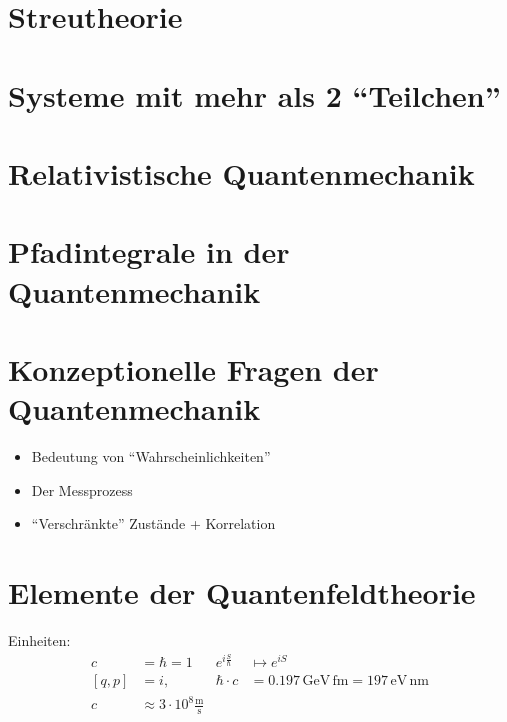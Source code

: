 \documentclass[ngerman, paper=a4, 12pt]{scrartcl}
\begin{document}
	\section{Streutheorie}
	 
	
	
	\section{Systeme mit mehr als 2 ``Teilchen''}
	
	
	 
	
	
	\section{Relativistische Quantenmechanik}
	
	
	
	\section{Pfadintegrale in der Quantenmechanik}
	
	
	
	
	
	
	
	
	
	
	\section{Konzeptionelle Fragen der Quantenmechanik} 
	\begin{itemize}
		\item Bedeutung von ``Wahrscheinlichkeiten''
		\item Der Messprozess
		\item ``Verschränkte'' Zustände + Korrelation
	\end{itemize}
	
	
	
	
	
	\section{Elemente der Quantenfeldtheorie} 
	Einheiten:
		\begin{align*}
			 c &= \hbar = 1 & e^{i \frac{S}{\hbar}} &\mapsto e^{iS} \\
			 [q, p] &= i ,&
			 \hbar \cdot c &= 0.197 \mathrm{\,GeV\,fm} = 197 \mathrm{\,eV\,nm} \\
			 c &\approx 3 \cdot 10^8 \frac{\mathrm{m}}{\mathrm{s}}
		\end{align*}
	
	
	
	
	
\end{document}
